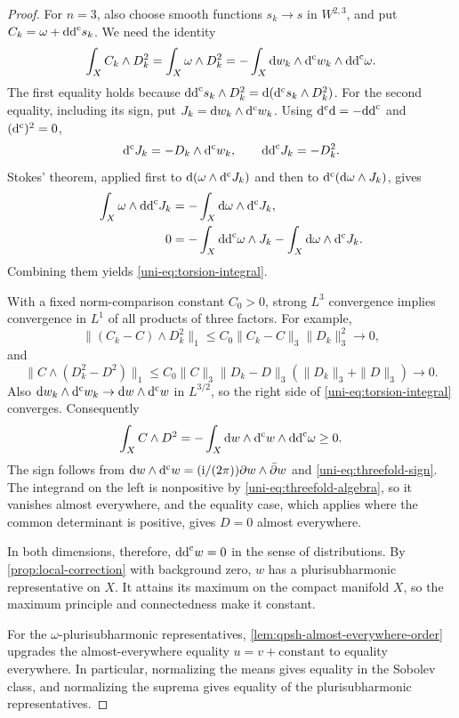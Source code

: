 \begin{proof}
For $n=3$, also choose smooth functions $s_k\to s$ in $W^{2,3}$, and put
$C_k=\omega+\mathrm{dd}^{\mathrm{c}} s_k$.  We need the identity
\begin{equation}\label{uni-eq:torsion-integral}
 \int_X C_k\wedge D_k^2
 =\int_X\omega\wedge D_k^2
 =-\int_X\mathrm{d}w_k\wedge \mathrm d^{\mathrm c} w_k\wedge\mathrm{dd}^{\mathrm{c}}\omega.
\end{equation}
The first equality holds because
$\mathrm{dd}^{\mathrm{c}} s_k\wedge D_k^2=\mathrm{d}(\mathrm d^{\mathrm c} s_k\wedge D_k^2)$.
For the second equality, including its sign, put
$J_k=\mathrm{d}w_k\wedge \mathrm d^{\mathrm c} w_k$.  Using
$\mathrm d^{\mathrm c} \mathrm{d}=-\mathrm{dd}^{\mathrm{c}} $ and $(\mathrm d^{\mathrm c} )^2=0$,
\[
 \mathrm d^{\mathrm c} J_k=-D_k\wedge \mathrm d^{\mathrm c} w_k,\qquad \mathrm{dd}^{\mathrm{c}} J_k=-D_k^2.
\]
Stokes' theorem, applied first to $\mathrm{d}(\omega\wedge \mathrm d^{\mathrm c} J_k)$ and then to
$\mathrm d^{\mathrm c} (\mathrm{d}\omega\wedge J_k)$, gives
\begin{align*}
 \int_X\omega\wedge\mathrm{dd}^{\mathrm{c}} J_k&=-\int_X\mathrm{d}\omega\wedge \mathrm d^{\mathrm c} J_k,\\
 0&=-\int_X\mathrm{dd}^{\mathrm{c}}\omega\wedge J_k-\int_X\mathrm{d}\omega\wedge \mathrm d^{\mathrm c} J_k.
\end{align*}
Combining them yields \eqref{uni-eq:torsion-integral}.

With a fixed norm-comparison constant $C_0>0$, strong $L^3$ convergence implies convergence in $L^1$ of all products of three
factors.  For example,
\[
 \|(C_k-C)\wedge D_k^2\|_1
 \leq C_0\|C_k-C\|_3\|D_k\|_3^2\longrightarrow0,
\]
and
\[
 \|C\wedge(D_k^2-D^2)\|_1
 \leq C_0\|C\|_3\|D_k-D\|_3(\|D_k\|_3+\|D\|_3)\longrightarrow0.
\]
Also $\mathrm{d}w_k\wedge \mathrm d^{\mathrm c} w_k\to \mathrm{d}w\wedge \mathrm d^{\mathrm c} w$ in $L^{3/2}$, so the
right side of \eqref{uni-eq:torsion-integral} converges.  Consequently
\begin{equation}\label{uni-eq:torsion-limit}
 \int_XC\wedge D^2=-\int_X\mathrm{d}w\wedge \mathrm d^{\mathrm c} w\wedge\mathrm{dd}^{\mathrm{c}}\omega\geq0.
\end{equation}
The sign follows from
$\mathrm{d}w\wedge \mathrm d^{\mathrm c} w=(\mathrm{i}/(2\pi))\partial w\wedge\bar\partial w$
and \eqref{uni-eq:threefold-sign}.  The integrand on the left is nonpositive by
\eqref{uni-eq:threefold-algebra}, so it vanishes almost everywhere, and the equality case,
which applies where the common determinant is positive, gives $D=0$ almost everywhere.

In both dimensions, therefore, $\mathrm{dd}^{\mathrm{c}} w=0$ in the sense of distributions. By \cref{prop:local-correction} with background zero, $w$ has a plurisubharmonic representative on $X$. It attains its maximum on the compact manifold $X$, so the maximum principle and connectedness make it constant.

For the $\omega$-plurisubharmonic representatives, \cref{lem:qpsh-almost-everywhere-order} upgrades the almost-everywhere equality $u=v+\text{constant}$ to equality everywhere. In particular, normalizing the means gives equality in the Sobolev class, and normalizing the suprema gives equality of the plurisubharmonic representatives.
\end{proof}

